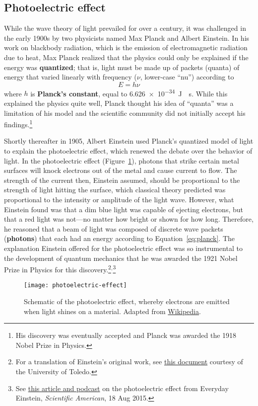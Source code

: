 \subsection{Photoelectric effect}
While the wave theory of light prevailed for over a century, it was challenged in the early 1900s by two physicists named Max Planck and Albert Einstein. In his work on blackbody radiation, which is the emission of electromagnetic radiation due to heat, Max Planck realized that the physics could only be explained if the energy was \textbf{quantized}; that is, light must be made up of packets (quanta) of energy that varied linearly with frequency ($\nu$, lower-case ``nu'') according to
\begin{equation}
	E = h\nu \label{eq:planck}
\end{equation}
where $h$ is \textbf{Planck's constant}, equal to \SI{6.626e-34}{\joule \cdot \second}. While this explained the physics quite well, Planck thought his idea of ``quanta'' was a limitation of his model and the scientific community did not initially accept his findings.\footnote{His discovery was eventually accepted and Planck was awarded the 1918 Nobel Prize in Physics.} \par

Shortly thereafter in 1905, Albert Einstein used Planck's quantized model of light to explain the photoelectric effect, which renewed the debate over the behavior of light. In the photoelectric effect (Figure~\ref{fig:PE-eff}), photons that strike certain metal surfaces will knock electrons out of the metal and cause current to flow. The strength of the current then, Einstein assumed, should be proportional to the strength of light hitting the surface, which classical theory predicted was proportional to the intensity or amplitude of the light wave. However, what Einstein found was that a dim blue light was capable of ejecting electrons, but that a red light was not---no matter how bright or shown for how long. Therefore, he reasoned that a beam of light was composed of discrete wave packets (\textbf{photons}) that each had an energy according to Equation~\ref{eq:planck}. The explanation Einstein offered for the photoelectric effect was so instrumental to the development of quantum mechanics that he was awarded the 1921 Nobel Prize in Physics for this discovery.\footnote{For a translation of Einstein's original work, see \href{http://astro1.panet.utoledo.edu/~ljc/PE\_eng.pdf}{this document} courtesy of the University of Toledo.}$^,$\footnote{See \href{https://www.scientificamerican.com/article/einstein-s-legacy-the-photoelectric-effect/}{this article and podcast} on the photoelectric effect from Everyday Einstein, \emph{Scientific American}, 18 Aug 2015.}
\begin{figure}[!h]
	\centering
	\texttt{[image: photoelectric-effect]}
	\caption{Schematic of the photoelectric effect, whereby electrons are emitted when light shines on a material. Adapted from \href{https://en.wikipedia.org/wiki/Photoelectric\_effect}{Wikipedia}.}
	\label{fig:PE-eff}
\end{figure}

